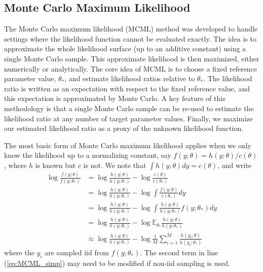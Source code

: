 \documentclass[11pt, oneside]{article}   	%
\newcommand{\bE}{\mathbb{E}}
\begin{document}
\subsection{Monte Carlo Maximum Likelihood}
\label{sec:MCML}

The Monte Carlo maximum likelihood (MCML) method was developed to handle settings where the likelihood function cannot be evaluated exactly. The idea is to approximate the whole likelihood surface (up to an additive constant) using a single Monte Carlo sample. This approximate likelihood is then maximized, either numerically or analytically. The core idea of MCML is to choose a fixed reference parameter value, $\theta_*$, and estimate likelihood ratios relative to $\theta_*$. The likelihood ratio is written as an expectation with respect to the fixed reference value, and this expectation is approximated by Monte Carlo. A key feature of this methodology is that a single Monte Carlo sample can be re-used to estimate the likelihood ratio at any number of target parameter values. Finally, we maximize our estimated likelihood ratio as a proxy of the unknown likelihood function.

The most basic form of Monte Carlo maximum likelihood \citep{Gey91} applies when we only know the likelihood up to a normalizing constant, say $f(y; \theta) = h(y; \theta) / c(\theta)$, where $h$ is known but $c$ is not. We note that $\int h(y; \theta) dy = c(\theta)$, and write
%
\begin{align}
    \log \frac{f(y; \theta)}{f(y; \theta_*)} &= \log \frac{h(y; \theta)}{h(y; \theta_*)} - \log \frac{c(\theta)}{c(\theta_*)}\\
    &= \log \frac{h(y; \theta)}{h(y; \theta_*)} - \log \int \frac{f(y; \theta)}{c(\theta_*)} dy\\
    &= \log \frac{h(y; \theta)}{h(y; \theta_*)} - \log \int \frac{h(y; \theta)}{h(y; \theta_*)} f(y; \theta_*) dy\\
    &= \log \frac{h(y; \theta)}{h(y; \theta_*)} - \log \bE_{\theta_*} \frac{h(y; \theta)}{h(y; \theta_*)}\\
    & \approx \log \frac{h(y; \theta)}{h(y; \theta_*)} - \log \frac{1}{M} \sum_{i=1}^M \frac{h(y_i; \theta)}{h(y_i; \theta_*)} \label{eq:MCML_simp}
\end{align}
%
where the $y_i$ are sampled iid from $f(y; \theta_*)$. The second term in line (\ref{eq:MCML_simp}) may need to be modified if non-iid sampling is used.
\end{document}
